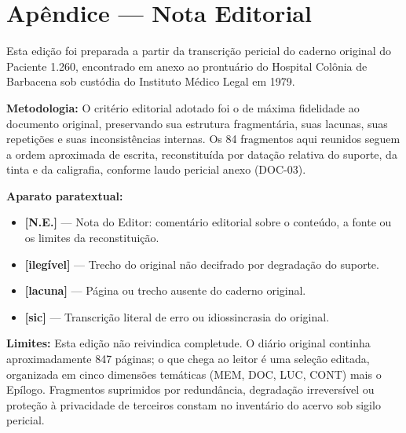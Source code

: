 \cleardoublepage
\thispagestyle{empty}
\chapter*{Apêndice --- Nota Editorial}

\begingroup

Esta edição foi preparada a partir da transcrição pericial do caderno original do Paciente 1.260, encontrado em anexo ao prontuário do Hospital Colônia de Barbacena sob custódia do Instituto Médico Legal em 1979.

\vspace{0.6em}

\noindent\textbf{Metodologia:}
O critério editorial adotado foi o de máxima fidelidade ao documento original, preservando sua estrutura fragmentária, suas lacunas, suas repetições e suas inconsistências internas. Os 84 fragmentos aqui reunidos seguem a ordem aproximada de escrita, reconstituída por datação relativa do suporte, da tinta e da caligrafia, conforme laudo pericial anexo (DOC-03).

\vspace{0.6em}

\noindent\textbf{Aparato paratextual:}
\begin{itemize}
  \item \textbf{[N.E.]} --- Nota do Editor: comentário editorial sobre o conteúdo, a fonte ou os limites da reconstituição.
  \item \textbf{[ilegível]} --- Trecho do original não decifrado por degradação do suporte.
  \item \textbf{[lacuna]} --- Página ou trecho ausente do caderno original.
  \item \textbf{[sic]} --- Transcrição literal de erro ou idiossincrasia do original.
\end{itemize}

\vspace{0.6em}

\noindent\textbf{Limites:}
Esta edição não reivindica completude. O diário original continha aproximadamente 847 páginas; o que chega ao leitor é uma seleção editada, organizada em cinco dimensões temáticas (MEM, DOC, LUC, CONT) mais o Epílogo. Fragmentos suprimidos por redundância, degradação irreversível ou proteção à privacidade de terceiros constam no inventário do acervo sob sigilo pericial.

